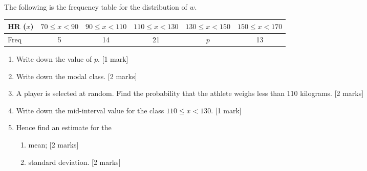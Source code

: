 \documentclass[12pt, twoside]{article}
\begin{document}
\begin{enumerate}
    \begin{center}
    \end{center}

    The following is the frequency table for the distribution of $w$. \\[0.25cm]
        \begin{tabular}{|l|c|c|c|c|c|}
        \hline
        HR ($x$) & $70 \leq x < 90$ & $90 \leq x < 110$ & $110 \leq x < 130$ & $130 \leq x < 150$ & $150 \leq x < 170$ \\ 
        \hline 
        Freq & 5 & 14 & 21 & $p$ & 13  \\ 
        \hline 
        \end{tabular}
        \begin{enumerate}
        \item Write down the value of $p$. \hfill [1 mark] \vspace{0.8cm}
        \item Write down the modal class. \hfill [2 marks] \vspace{0.8cm}
        \item A player is selected at random. Find the probability that the athlete weighs less than 110 kilograms. \hfill [2 marks] \vspace{1cm}
        \item Write down the mid-interval value for the class $110 \leq x < 130$. \hfill [1 mark] \vspace{0.8cm}
        \item Hence find an estimate for the
        \begin{enumerate}
            \item mean; \hfill [2 marks] \vspace{0.8cm}
            \item standard deviation. \hfill [2 marks] 
        \end{enumerate}
        \end{enumerate}


\end{enumerate}
\end{document}
